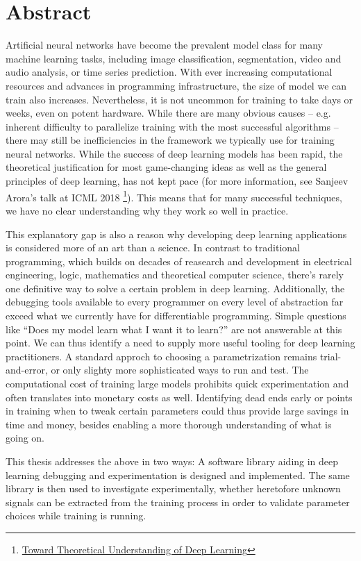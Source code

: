 \chapter*{Abstract}

Artificial neural networks have become the prevalent model class for many
machine learning tasks, including image classification, segmentation, video and
audio analysis, or time series prediction. With ever increasing computational
resources and advances in programming infrastructure, the size of model we can
train also increases. Nevertheless, it is not uncommon for training to take days
or weeks, even on potent hardware. While there are many obvious causes -- e.g.
inherent difficulty to parallelize training with the most successful algorithms
-- there may still be inefficiencies in the framework we typically use for
training neural networks. While the success of deep learning models has been
rapid, the theoretical justification for most game-changing ideas as well as the
general principles of deep learning, has not kept pace (for more information,
see Sanjeev Arora's talk at ICML 2018
\footnote{\href{https://www.youtube.com/watch?v=rcR6P5O8CpU}{Toward Theoretical
Understanding of Deep Learning}}). This means that for many successful
techniques, we have no clear understanding why they work so well in practice.


This explanatory gap is also a reason why developing deep learning applications is considered more of an art than a
science. In contrast to traditional programming, which builds on decades of reasearch and development in electrical
engineering, logic, mathematics and theoretical computer science, there's rarely one definitive way to solve a certain
problem in deep learning. Additionally, the debugging tools available to every programmer on every level of abstraction
far exceed what we currently have for differentiable programming. Simple questions like ``Does my model learn what I want
it to learn?'' are not answerable at this point.  We can thus identify a need to supply more useful tooling for deep
learning practitioners.  A standard approch to choosing a parametrization remains trial-and-error, or only slighty more
sophisticated ways to run and test.  The computational cost of training large models prohibits quick experimentation and
often translates into monetary costs as well. Identifying dead ends early or points in training  when to tweak certain
parameters could thus provide large savings in time and money, besides enabling a more thorough understanding of what is
going on.

This thesis addresses the above in two ways: A software library aiding in deep learning debugging and experimentation is
designed and implemented. The same library is then used to investigate experimentally, whether heretofore unknown
signals can be extracted from the training process in order to validate parameter choices while training is running.
